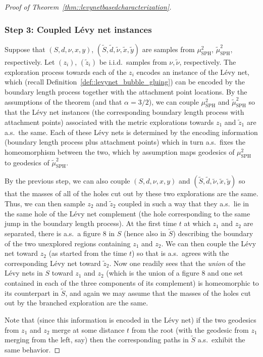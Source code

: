 \documentclass[10pt]{amsart}
\theoremstyle{plain}
\numberwithin{theorem}{section}
\theoremstyle{definition}
\newcommand{\mustwo}{\mu_{\mathrm{SPH}}^2}
\newcommand{\tmustwo}{\wt{\mu}_{\mathrm{SPH}}^2}
\let\wt\widetilde
\begin{document}
\begin{proof}[Proof of Theorem~\ref{thm::levynetbasedcharacterization}]
\subsubsection*{Step 3: Coupled Lévy net instances} Suppose that $(S,d,\nu,x,y)$, $(\wt{S},\wt{d},\wt{\nu},\wt{x},\wt{y})$ are samples from $\mustwo$, $\tmustwo$, respectively. Let $(z_i)$, $(\wt{z}_i)$ be i.i.d.\ samples from $\nu, \wt{\nu}$, respectively. The exploration process towards each of the $z_i$ encodes an instance of the Lévy net, which (recall Definition~\ref{def::levynet_bubble_gluing}) can be encoded by the boundary length process together with the attachment point locations. By the assumptions of the theorem (and that $\alpha=3/2$), we can couple $\mustwo$ and $\tmustwo$ so that the Lévy net instances (\ie the corresponding boundary length process with attachment points) associated with the metric explorations towards $z_1$ and $\wt{z}_1$ are a.s.\ the same. Each of these Lévy nets is determined by the encoding information (boundary length process plus attachment points) which in turn a.s.\ fixes the homeomorphism between the two, which by assumption maps geodesics of $\mustwo$ to geodesics of $\tmustwo$.

By the previous step, we can also couple $(S,d,\nu,x,y)$ and $(\wt{S},\wt{d},\wt{\nu},\wt{x},\wt{y})$ so that the masses of all of the holes cut out by these two explorations are the same. Thus, we can then sample $z_2$ and $\wt{z}_2$ coupled in such a way that they a.s.\ lie in the same hole of the Lévy net complement (\ie the hole corresponding to the same jump in the boundary length process). At the first time $t$ at which $z_1$ and $z_2$ are separated, there is a.s.\ a figure $8$ in $S$ (hence also in $\wt S$) describing the boundary of the two unexplored regions containing $z_1$ and $z_2$. We can then couple the Lévy net toward $z_2$ (as started from the time $t$) so that is a.s.\ agrees with the corresponding Lévy net toward $\wt{z}_2$. Now one readily sees that the \emph{union} of the Lévy nets in $S$ toward $z_1$ and $z_2$ (which is the union of a figure $8$ and one set contained in each of the three components of its complement) is homeomorphic to its counterpart in $\wt{S}$, and again we may assume that the masses of the holes cut out by the branched exploration are the same.

Note that (since this information is encoded in the Lévy net) if the two geodesics from $z_1$ and $z_2$ merge at some distance $t$ from the root (with the geodesic from $z_1$ merging from the left, say) then the corresponding paths in $\wt{S}$ a.s.\ exhibit the same behavior.


\end{proof}
\end{document}
